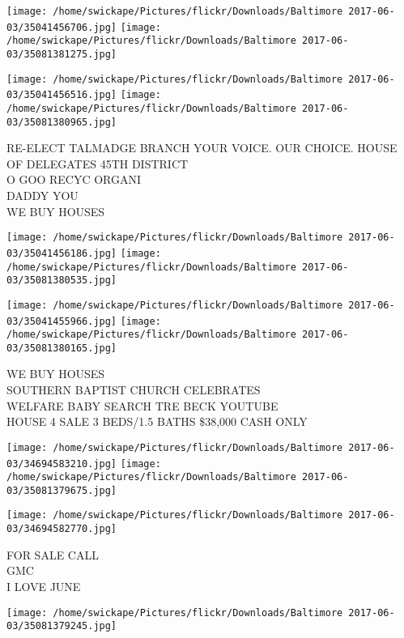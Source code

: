 \documentclass[10pt,letterpaper]{article}
\begin{document}
\texttt{[image: /home/swickape/Pictures/flickr/Downloads/Baltimore 2017-06-03/35041456706.jpg]}
\texttt{[image: /home/swickape/Pictures/flickr/Downloads/Baltimore 2017-06-03/35081381275.jpg]}

\texttt{[image: /home/swickape/Pictures/flickr/Downloads/Baltimore 2017-06-03/35041456516.jpg]}
\texttt{[image: /home/swickape/Pictures/flickr/Downloads/Baltimore 2017-06-03/35081380965.jpg]}

RE{-}ELECT TALMADGE BRANCH YOUR VOICE.  OUR CHOICE.  HOUSE OF DELEGATES 45TH DISTRICT\\
O GOO RECYC ORGANI\\
DADDY YOU\\
WE BUY HOUSES\\
\pagebreak

\texttt{[image: /home/swickape/Pictures/flickr/Downloads/Baltimore 2017-06-03/35041456186.jpg]}
\texttt{[image: /home/swickape/Pictures/flickr/Downloads/Baltimore 2017-06-03/35081380535.jpg]}

\texttt{[image: /home/swickape/Pictures/flickr/Downloads/Baltimore 2017-06-03/35041455966.jpg]}
\texttt{[image: /home/swickape/Pictures/flickr/Downloads/Baltimore 2017-06-03/35081380165.jpg]}

WE BUY HOUSES\\
SOUTHERN BAPTIST CHURCH CELEBRATES\\
WELFARE BABY SEARCH TRE BECK YOUTUBE\\
HOUSE 4 SALE 3 BEDS/1.5 BATHS \$38,000 CASH ONLY\\
\pagebreak

\texttt{[image: /home/swickape/Pictures/flickr/Downloads/Baltimore 2017-06-03/34694583210.jpg]}
\texttt{[image: /home/swickape/Pictures/flickr/Downloads/Baltimore 2017-06-03/35081379675.jpg]}

\vspace{0.25in}
\texttt{[image: /home/swickape/Pictures/flickr/Downloads/Baltimore 2017-06-03/34694582770.jpg]}

FOR SALE CALL\\
GMC\\
I LOVE JUNE\\
\pagebreak

\texttt{[image: /home/swickape/Pictures/flickr/Downloads/Baltimore 2017-06-03/35081379245.jpg]}
\end{document}
